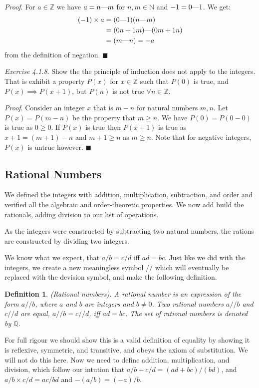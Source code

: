 \documentclass{article}
\newtheorem{definition}{Definition}[subsection]
\newcommand{\Q}{\mathbb{Q}}
\newcommand{\Z}{\mathbb{Z}}
\newcommand{\N}{\mathbb{N}}
\newcommand{\mem}{\text{\textemdash}} %
\let\it\textit
\begin{document}
\it{Proof}. For $a \in \Z$ we have $a = n \mem m$ for $n,m \in \N$ 
and $-1 = 0\mem 1$. We get: 
\begin{align*}
	(-1) \times a &= (0 \mem 1)(n \mem m) \\
		      &= (0n + 1m) \mem (0m + 1n)  \\
		      &= (m \mem n) = -a
\end{align*}
from the definition of negation. \hfill $\blacksquare$

\it{Exercise 4.1.8}. Show the the principle of induction does 
not apply to the integers. That is exhibit a property $P(x)$ for 
$x \in \Z$ such that $P(0)$ is true, and $P(x) \implies P(x+1)$, 
but $P(n)$ is not true $\forall n \in \Z$.

\it{Proof}. Consider an integer $x$ that is $m - n$ for 
natural numbers $m,n$. Let $P(x) = P(m-n)$ be the property that $m \geq n$. 
We have $P(0) = P(0-0)$ is true as $0 \geq 0$. If $P(x)$ is true 
then $P(x+1)$ is true as $x+1 = (m+1) - n$ and $m+1 \geq n$ as $m \geq n$.
Note that for negative integers, $P(x)$ is untrue however.
\hfill $\blacksquare$

\subsection{Rational Numbers}

We defined the integers with addition, multiplication, subtraction, 
and order and verified all the algebraic and order-theoretic 
properties. We now add build the rationals, adding division 
to our list of operations.

As the integers were constructed by subtracting two natural 
numbers, the rations are constructed by dividing two integers.

We know what we expect, that $a/b = c/d$ iff $ad = bc$. Just 
like we did with the integers, we create a new meaningless 
symbol $//$ which will eventually be replaced with the devision 
symbol, and make the following definition.

\begin{definition}
	(Rational numbers). A rational number is an expression of the	
	form $a//b$, where $a$ and $b$ are integers and $b \neq 0$.
	Two rational numbers $a//b$ and $c//d$ are equal, $a//b = c//d$,
	iff $ad = bc$. The set of rational numbers is denoted by $\Q$.
\end{definition}

For full rigour we should show this is a valid definition of equality
by showing it is reflexive, symmetric, and transitive, and obeys
the axiom of substitution. We will not do this here. Now we 
need to define addition, multiplication, and division, which 
follow our intution that $a/b + c/d = (ad + bc)/(bd)$,
and $a/b \times c/d = ac/bd$ and $-(a/b) = (-a)/b$.
\end{document}
